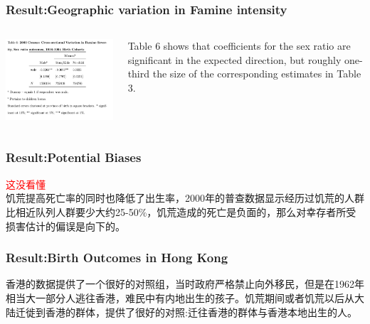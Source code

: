 \documentclass{beamer}
\begin{document}
\begin{frame}
\frametitle{Result:Geographic variation in Famine intensity}
    \begin{columns}
            \begin{minipage}[c][0.4\textheight][c]{\linewidth}
                \centering
                \includegraphics[width=1\linewidth]{table6}
            \end{minipage}
           
            \begin{minipage}[c][0.4\textheight][c]{\linewidth}
            Table 6 shows that coeﬃcients for the sex ratio are signiﬁcant in the expected direction, but roughly one-third the size of the corresponding estimates in Table 3.
            \end{minipage}
    \end{columns}
\end{frame}

\begin{frame}
	\frametitle{Result:Potential Biases}
   \textcolor{red}{这没看懂}
   \\ 饥荒提高死亡率的同时也降低了出生率，2000年的普查数据显示经历过饥荒的人群比相近队列人群要少大约25-50\%，饥荒造成的死亡是负面的，那么对幸存者所受损害估计的偏误是向下的。
\end{frame}

\begin{frame}
	\frametitle{Result:Birth Outcomes in Hong Kong}
香港的数据提供了一个很好的对照组，当时政府严格禁止向外移民，但是在1962年相当大一部分人逃往香港，难民中有内地出生的孩子。饥荒期间或者饥荒以后从大陆迁徙到香港的群体，提供了很好的对照:迁往香港的群体与香港本地出生的人。
\end{frame}
\end{document}
